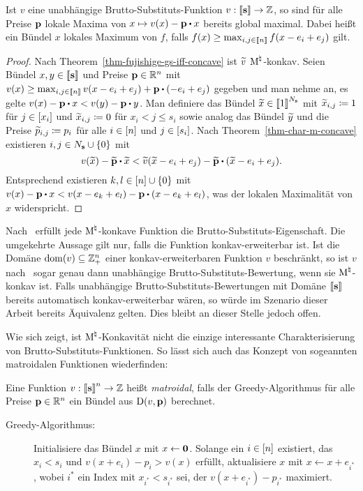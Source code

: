 \begin{korollar}\label{cor-independent-local-global}
	Ist $v$ eine unabhängige Brutto-Substituts-Funktion $v:\left\llbracket \mathbf{s} \right\rrbracket \rightarrow \mathbb{Z}$, so sind für alle Preise $\mathbf{p}$ lokale Maxima von $x\mapsto v(x) - \fp \bcdot x$ bereits global maximal.
	Dabei heißt ein Bündel $x$ lokales Maximum von $f$, falls $f(x)\geq \max_{i,j\in\left\llbracket n \right\rrbracket} f(x - e_i + e_j)$ gilt.
\end{korollar}
\begin{proof}
	Nach Theorem~\ref{thm-fujishige-gs-iff-concave} ist $\widetilde{v}$ $\textrm{\textup{M}}^\natural$-konkav.
	Seien Bündel $x,y\in\left\llbracket \mathbf{s} \right\rrbracket$ und Preise $\mathbf{p}\in\mathbb{R}^n$ mit $v(x)\geq \max_{i,j\in\ffirst{n}} v(x - e_i + e_j) + \fp \bcdot(-e_i + e_j)$ gegeben und man nehme an, es gelte $v(x) - \fp \bcdot x < v(y) - \fp\bcdot y$.
	Man definiere das Bündel $\widetilde{x}\in\left\llbracket 1 \right\rrbracket^{N_{\mathbf{s}}}$ mit $\widetilde{x}_{i,j} \coloneqq 1$ für $j\in\left[ x_i \right]$ und $\widetilde{x}_{i,j} \coloneqq 0$ für $x_i < j \leq s_i$ sowie analog das Bündel $\widetilde{y}$ und die Preise $\widetilde{p}_{i,j}\coloneqq p_i$ für alle $i\in\left[ n \right]$ und $j\in\left[ s_i \right]$.
	Nach Theorem~\ref{thm-char-m-concave} existieren $i,j\in N_{\mathbf{s}} \cup \{ 0 \}$ mit \[
	v(\tild{x}) - \tild{\fp} \bcdot \tild{x} < \tild{v}(\tild{x} - e_i + e_j) - \tild{\fp}\bcdot (\tild{x} - e_i + e_j) .\]
	Entsprechend existieren $k,l\in\left[ n \right]\cup\{ 0 \}$ mit $ v(x) - \fp\bcdot x < v(x - e_k + e_l) - \fp \bcdot (x - e_k + e_l)$, was der lokalen Maximalität von $x$ widerspricht.
\end{proof}
\begin{bemerkung}
	Nach~\cite[Theorem~11.5]{Murota2003} erfüllt jede $\textrm{\textup{M}}^\natural$-konkave Funktion die Brutto-Substituts-Eigenschaft.
	Die umgekehrte Aussage gilt nur, falls die Funktion konkav-er\-weiter\-bar ist.
	Ist die Domäne $\operatorname{dom}(v)\subseteq \mathbb{Z}^n_+$ einer konkav-erweiterbaren Funktion $v$ beschränkt, so ist $v$ nach~\cite[Theorem~4.1]{AkiyoshiShioura2015} sogar genau dann unabhängige Brutto-Substituts-Bewertung, wenn sie $\textrm{\textup{M}}^\natural$-konkav ist.
	Falls unabhängige Brutto-Substituts-Bewer\-tungen mit Domäne $\left\llbracket \mathbf{s} \right\rrbracket$ bereits automatisch konkav-erweiter\-bar wären, so würde im Szenario dieser Arbeit bereits Äquivalenz gelten.
	Dies bleibt an dieser Stelle jedoch offen.
\end{bemerkung}

Wie sich zeigt, ist $\textrm{\textup{M}}^\natural$-Konkavität nicht die einzige interessante Charakterisierung von Brutto-Substituts-Funktionen.
So lässt sich auch das Konzept von sogeannten matroidalen Funktionen wiederfinden:
\begin{definition}
	Eine Funktion $v:\left\llbracket \mathbf{s} \right\rrbracket^n\rightarrow \mathbb{Z}$ heißt \emph{matroidal}, falls
	der Greedy-Algorithmus für alle Preise $\mathbf{p}\in\mathbb{R}^n$ ein Bündel aus $\operatorname{D}(v, \mathbf{p})$ berechnet.
	\begin{description}
		\item[Greedy-Algorithmus:] Initialisiere das Bündel $x$ mit $x\leftarrow \mathbf{0}$.
		Solange ein $i\in\left[ n \right]$ existiert, das $x_i < s_i$ und $v(x + e_i) - p_i > v(x)$ erfüllt,
		aktualisiere $x$ mit $x\leftarrow x + e_{i^*}$, wobei $i^*$ ein Index mit $x_{i^*}<s_{i^*}$ sei, der $v(x + e_{i^*}) - p_{i^*}$ maximiert.
	\end{description}
\end{definition}

